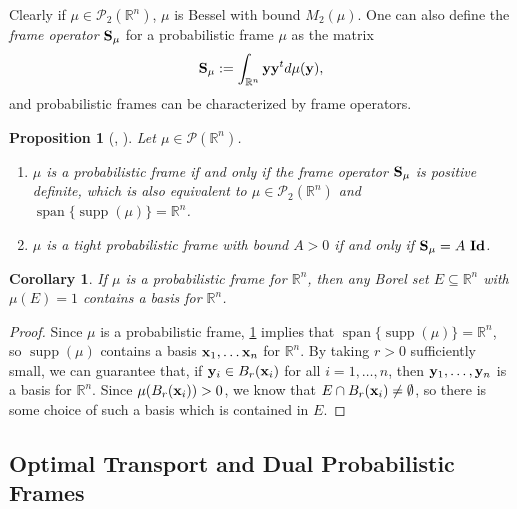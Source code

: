 \documentclass{amsart}
\numberwithin{equation}{section}
\newcommand\R{{\mathbb R}}
\DeclareMathOperator{\supp}{supp}
\DeclareMathOperator{\spa}{span}
\theoremstyle{plain}
\newtheorem{proposition}[theorem]{Proposition}
\newtheorem{corollary}[theorem]{Corollary}
\theoremstyle{remark}
\theoremstyle{definition}
\begin{document}
Clearly if $\mu \in  \mathcal{P}_2(\mathbb{R}^n)$, $\mu$ is Bessel with bound $M_2(\mu) $. One can also define the \emph{frame operator} ${\bf S}_\mu$ for a probabilistic frame $\mu$  as the matrix
    \begin{equation*}
          {\bf S}_\mu := \int_{\mathbb{R}^n}  {\bf y} {\bf y}^t d \mu({\bf y}),
    \end{equation*}
and probabilistic frames can be characterized by frame operators. 

 \begin{proposition}[{\cite[Theorem 12.1]{ehler2013probabilistic}, \cite[Proposition 3.1]{maslouhi2019probabilistic}}] \label{TAcharacterization}
Let $\mu  \in \mathcal{P}(\mathbb{R}^n)$. 
\begin{enumerate}
    \item $\mu$ is a probabilistic frame if and only if the frame operator ${\bf S}_{\mu}$ is positive definite, which is also equivalent to  $\mu \in \mathcal{P}_2(\mathbb{R}^n)$ and $\spa\{\supp(\mu)\} = \mathbb{R}^n$.
   
     \item  $\mu$ is a tight probabilistic frame with bound $A > 0$ if and only if ${\bf S}_{\mu} = A \ {\bf Id}$. 
\end{enumerate}
\end{proposition}

\begin{corollary}\label{cor:full measure contains basis}
    If $\mu$ is a probabilistic frame for $\R^n$, then any Borel set $E \subseteq \R^n$ with $\mu(E) = 1$ contains a basis for $\R^n$.
\end{corollary}
\begin{proof}
    Since $\mu$ is a probabilistic frame, \cref{TAcharacterization} implies that $\spa\{\supp(\mu)\} = \R^n$, so $\supp(\mu)$ contains a basis ${\bf x}_1, \dots {\bf x}_n$ for $\R^n$. By taking $r>0$ sufficiently small, we can guarantee that, if ${\bf y}_i \in B_r({\bf x}_i)$ for all $i = 1, \dots , n$, then ${\bf y}_1, \dots , {\bf y}_n$ is a basis for $\R^n$. Since $\mu(B_r({\bf x}_i)) > 0$, we know that $E \cap B_r({\bf x}_i) \neq \emptyset$, so there is some choice of such a basis which is contained in $E$.
\end{proof}

\subsection{Optimal Transport and Dual Probabilistic Frames}
\end{document}
